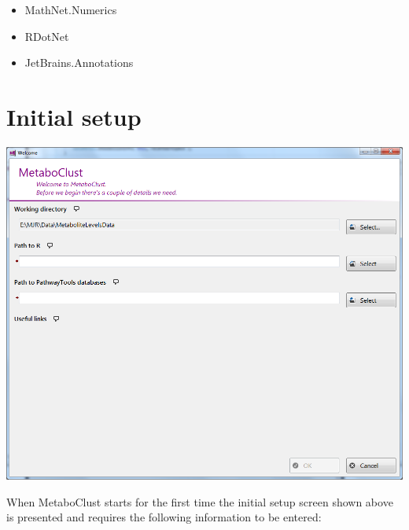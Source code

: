 \documentclass[11pt,a4paper]{article}
\begin{document}
\begin{itemize}
	\item MathNet.Numerics
	\item RDotNet
	\item JetBrains.Annotations
\end{itemize}

\section{Initial setup}
\label{section:ug_initial_setup}
\begin{center}
\includegraphics[max width=0.7\linewidth]{"Images/userguide/initial setup"}
\end{center}
When MetaboClust starts for the first time the initial setup screen shown above is presented and requires the following information to be entered:
\end{document}
